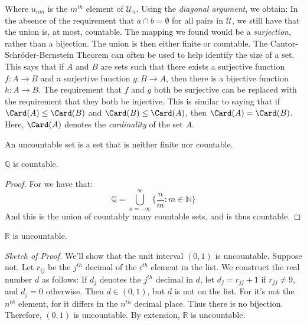         Where $u_{nm}$ is the $m^{th}$ element of
        $\mathcal{U}_{n}$.
        Using the \textit{diagonal argument},
        we obtain:
        In the absence of the requirement that
        $a\cap{b}=\emptyset$ for all pairs in $\mathcal{U}$,
        we still have that the union is, at most, countable.
        The mapping we found would be a
        \textit{surjection}, rather than a bijection.
        The union is then either finite or countable. The
        Cantor-Schr\"{o}der-Bernstein Theorem can often be
        used to help identify the size of a set. This says
        that if $A$ and $B$ are sets such that there exists
        a surjective function $f:A\rightarrow{B}$ and a
        surjective function $g:B\rightarrow{A}$, then there
        is a bijective function $h:A\rightarrow{B}$. The
        requirement that $f$ and $g$ both be surjective
        can be replaced with the requirement that they both
        be injective. This is similar to saying that if
        $\Card(A)\leq\Card(B)$ and $\Card(B)\leq\Card(A)$,
        then $\Card(A)=\Card(B)$. Here, $\Card(A)$ denotes
        the \textit{cardinality} of the set $A$.
        \begin{definition}
            An uncountable set is a set that is
            neither finite nor countable.
        \end{definition}
        \begin{theorem}
            $\mathbb{Q}$ is countable.
        \end{theorem}
        \begin{proof}
            For we have that:
            \begin{equation}
                \mathbb{Q}=
                \bigcup_{n=-\infty}^{\infty}
                \Big\{\frac{n}{m}:m\in\mathbb{N}\Big\}
            \end{equation}
            And this is the union of countably
            many countable sets, and is thus countable.
        \end{proof}
        \begin{theorem}
            $\mathbb{R}$ is uncountable.
        \end{theorem}
        \textit{Sketch of Proof.} We'll show that the unit
        interval $(0,1)$ is uncountable. Suppose not.
        Let $r_{ij}$ be the $j^{th}$ decimal of the $i^{th}$
        element in the list. We construct the real number
        $d$ as follows: If $d_{j}$ denotes the $j^{th}$
        decimal in $d$, let $d_{j}=r_{jj}+1$ if
        $r_{jj}\ne{9}$, and $d_{j}=0$ otherwise. Then
        $d\in(0,1)$, but $d$ is not on the list. For it's not
        the $n^{th}$ element, for it differs in the
        $n^{th}$ decimal place. Thus there is no bijection.
        Therefore, $(0,1)$ is uncountable. By extension,
        $\mathbb{R}$ is uncountable.
